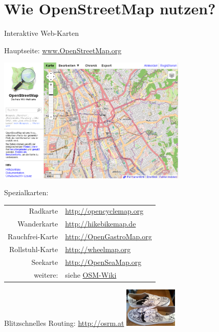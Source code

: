 \documentclass{beamer}
\begin{document}
\section{Wie OpenStreetMap nutzen?}

\begin{frame}{Interaktive Web-Karten}

Hauptseite: \href{http://osm.org}{www.OpenStreetMap.org}

 \begin{center}
 \includegraphics[width=9cm]{mainpage.png}
 \end{center}



\end{frame}

\begin{frame}{Spezialkarten:}


  \begin{table}[htbp]
    \centering
    \begin{tabular}{r|l}
      Radkarte  &  \url{http://opencyclemap.org} \\
      Wanderkarte & \url{http://hikebikemap.de} \\
      Rauchfrei-Karte & \url{http://OpenGastroMap.org} \\
      Rollstuhl-Karte & \url{http://wheelmap.org} \\
      Seekarte & \url{http://OpenSeaMap.org} \\
\pause
      200 weitere: & siehe \href{http://wiki.openstreetmap.org/wiki/List\_of\_OSM\_based\_Services}{OSM-Wiki} \\
    \end{tabular}
  \end{table}

  Blitzschnelles Routing: \url{http://osrm.at} \hspace{1cm} \includegraphics[width=2.5cm]{shoes.jpg}

\end{frame}
\end{document}
